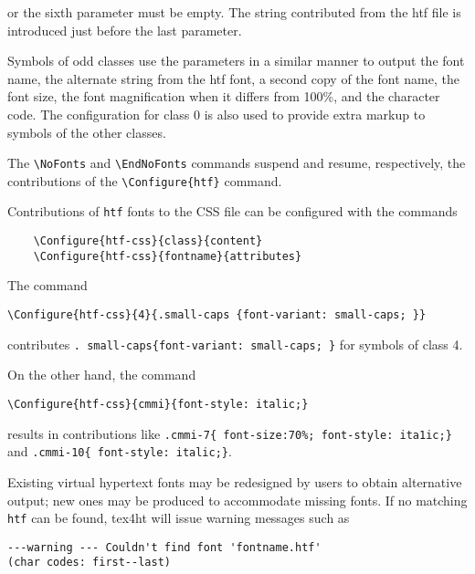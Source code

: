  
or the sixth parameter must be empty. The string contributed from the htf file is 
introduced just before the last parameter. 

Symbols of odd classes use the parameters in a similar manner to output the 
font name, the alternate string from the htf font, a second copy of the font name, 
the font size, the font magnification when it differs from 100\%, and the character 
code. The configuration for class 0 is also used to provide extra markup to symbols 
of the other classes. 

The \verb|\NoFonts| and \verb|\EndNoFonts| commands suspend and resume, respectively, 
the contributions of the \verb|\Configure{htf}| command. 


Contributions of \verb|htf| fonts to the CSS file can be configured with the commands 

\begin{lstlisting}
	\Configure{htf-css}{class}{content} 
	\Configure{htf-css}{fontname}{attributes} 
\end{lstlisting}

The command 

\begin{lstlisting}
\Configure{htf-css}{4}{.small-caps {font-variant: small-caps; }} 
\end{lstlisting}

contributes \verb|. small-caps{font-variant: small-caps; }| for symbols of class 4. 

On the other hand, the command 

\begin{lstlisting}
\Configure{htf-css}{cmmi}{font-style: italic;} 
\end{lstlisting}

results in contributions like \verb|.cmmi-7{ font-size:70%; font-style: ita1ic;}| 
and \verb|.cmmi-10{ font-style: italic;}|. 


Existing virtual hypertext fonts may be redesigned by users to obtain alternative 
output; new ones may be produced to accommodate missing fonts. If no matching 
\verb|htf| can be found, tex4ht will issue warning messages such as 

\begin{verbatim}
---warning --- Couldn't find font 'fontname.htf'
(char codes: first--last) 
\end{verbatim}

